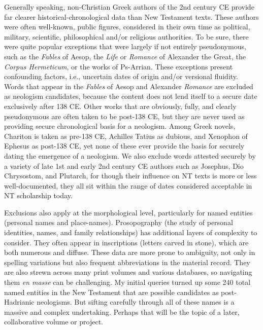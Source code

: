 Generally speaking, non-Christian Greek authors of the 2nd century CE provide far clearer historical-chronological data %
than New Testament texts. %
These authors were often well-known, public figures, %
considered in their own time as political, military, scientific, philosophical and/or religious authorities. %
To be sure, there were quite popular exceptions that were largely if not entirely pseudonymous, %
such as the \textit{Fables} of Aesop, %
the \textit{Life} or \textit{Romance} of Alexander the Great, the \textit{Corpus Hermeticum}, %
or the works of Ps-Arrian. %
These exceptions present confounding factors, i.e., uncertain dates of origin and/or versional fluidity. %
Words that appear in the \textit{Fables} of Aesop and Alexander \textit{Romance} are excluded %
as neologism candidates, because the content does not lend itself to a secure date exclusively after 138 CE. %
Other works that are obviously, fully, and clearly pseudonymous are often taken to be post-138 CE, %
but they are never used as providing secure chronological basis for a neologism. %
Among Greek novels, Chariton is taken as pre-138 CE, Achilles Tatius as dubious, %
and Xenophon of Ephesus as post-138 CE, %
yet none of these ever provide the basis for securely dating the emergence of a neologism. %
We also exclude words attested securely by a variety of late %
1st and early 2nd century CE authors such as Josephus, Dio Chrysostom, and Plutarch, %
for though their influence on NT texts is more or less well-documented, 
they all sit within the range of dates considered acceptable in NT scholarship today. %

Exclusions also apply at the morphological level, particularly for named entities (personal names and place-names). %
Prosopography (the study of personal identities, names, and family relationships) %
has additional layers of complexity to consider. %
They often appear in inscriptions (letters carved in stone), which are both numerous and diffuse. %
These data are more prone to ambiguity, not only in spelling variations %
but also frequent abbreviations in the material record. %
They are also strewn across many print volumes and various databases, %
so navigating them \textit{en masse} can be challenging. %
My initial queries turned up some 240 total named entities in the New Testament %
that are possible candidates as post-Hadrianic neologisms. %
But sifting carefully through all of these names is a massive and complex undertaking. %
Perhaps that will be the topic of a later, collaborative volume or project. %

